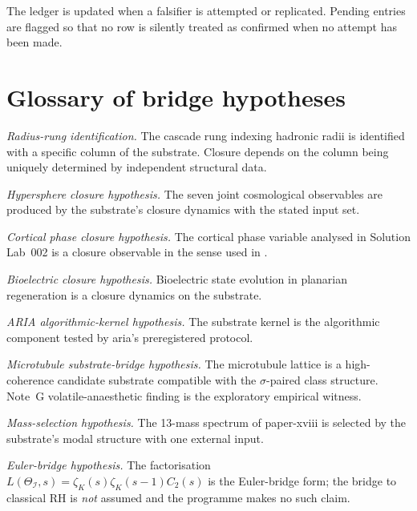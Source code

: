 \documentclass[11pt,a4paper]{article}
\newcommand{\II}{\mathcal{I}}
\begin{document}
\bigskip

\noindent
The ledger is updated when a falsifier is attempted or replicated.
Pending entries are flagged so that no row is silently treated as
confirmed when no attempt has been made.

\section{Glossary of bridge hypotheses}
\label{app:bridges}

\begin{description}[leftmargin=*]
  \item[H-RP] \emph{Radius-rung identification.} The cascade rung
              indexing hadronic radii is identified with a specific
              column of the substrate. Closure depends on the
              column being uniquely determined by independent
              structural data.
  \item[H-cosmo-closure] \emph{Hypersphere closure hypothesis.}
              The seven joint cosmological observables are produced
              by the substrate's closure dynamics with the stated
              input set.
  \item[H-CortexClosure] \emph{Cortical phase closure hypothesis.}
              The cortical phase variable analysed in Solution
              Lab~002 is a closure observable in the sense used
              in \cite{closurePicture}.
  \item[H-Bioclosure] \emph{Bioelectric closure hypothesis.}
              Bioelectric state evolution in planarian regeneration
              is a closure dynamics on the substrate.
  \item[H-AlgoKernel] \emph{ARIA algorithmic-kernel hypothesis.}
              The substrate kernel is the algorithmic component
              tested by aria's preregistered protocol.
  \item[H-MT-Bridge] \emph{Microtubule substrate-bridge hypothesis.}
              The microtubule lattice is a high-coherence candidate
              substrate compatible with the $\sigma$-paired class
              structure. Note~G volatile-anaesthetic finding is the
              exploratory empirical witness.
  \item[H-mass-selection] \emph{Mass-selection hypothesis.}
              The 13-mass spectrum of paper-xviii is selected by
              the substrate's modal structure with one external
              input.
  \item[H-EulerBridge] \emph{Euler-bridge hypothesis.}
              The factorisation
              $L(\Theta_\II,s) = \zeta_K(s)\zeta_K(s-1)C_2(s)$
              is the Euler-bridge form; the bridge to classical
              RH is \emph{not} assumed and the programme makes no
              such claim.
\end{description}

\bigskip



\end{document}
